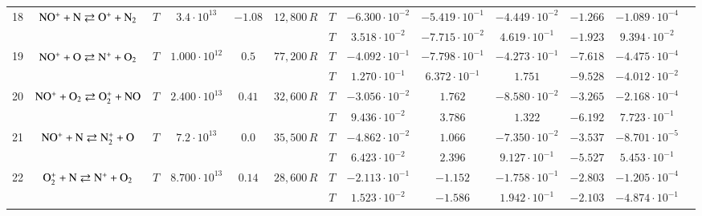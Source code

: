 \documentclass{warpdoc}
\begin{document}
\begin{table}[!ht]
\begin{center}
\begin{threeparttable}
\begin{tabular}{ccccccccccccc}
                                         
18 & $\rm NO^+ + N \rightleftarrows O^+ + N_2 $ &$T$ & $3.4 \cdot 10^{13}$ & $-1.08$ & $12,800\, R$ 
                                          &$T$  & $-6.300 \cdot 10^{-2}$  & $-5.419 \cdot 10^{-1}$  & $-4.449 \cdot 10^{-2}$ & $-1.266$ & $-1.089 \cdot 10^{-4}$ & \multirow{2}{*}{\cite{book:1990:park,ijhmt:2021:kim}} \\
 & & & & &                                &$T$  & $3.518 \cdot 10^{-2}$  & $-7.715 \cdot 10^{-2}$  & $4.619 \cdot 10^{-1}$ & $-1.923$ & $9.394 \cdot 10^{-2}$ & ~ \\
 
                                          
19 & $\rm NO^+ + O \rightleftarrows N^+ + O_2 $ &$T$ & $1.000 \cdot 10^{12}$ & $0.5$ & $77,200\, R$ 
                                          &$T$  & $-4.092 \cdot 10^{-1}$  & $-7.798 \cdot 10^{-1}$  & $-4.273 \cdot 10^{-1}$ & $-7.618$ & $-4.475 \cdot 10^{-4}$ & \multirow{2}{*}{\cite{book:1990:park,ijhmt:2021:kim}} \\
 & & & & &                                &$T$  & $1.270 \cdot 10^{-1}$  & $6.372 \cdot 10^{-1}$  & $1.751$ & $-9.528$ & $-4.012 \cdot 10^{-2}$ & ~ \\
 
                                          
20 & $\rm NO^{+} + O_2 \rightleftarrows O_2^{+} + NO $ &$T$ & $2.400 \cdot 10^{13}$ & $0.41$ & $32,600\, R$ 
                                          &$T$  & $-3.056 \cdot 10^{-2}$  & $1.762$  & $-8.580 \cdot 10^{-2}$ & $-3.265$ & $-2.168 \cdot 10^{-4}$ & \multirow{2}{*}{\cite{book:1990:park,ijhmt:2021:kim}} \\
 & & & & &                                &$T$  & $9.436 \cdot 10^{-2}$  & $3.786$  & $1.322$ & $-6.192$ & $7.723 \cdot 10^{-1}$ & ~ \\
 
                                          
21 & $\rm NO^+ + N \rightleftarrows N_2^+ + O $ &$T$ & $7.2 \cdot 10^{13}$ & $0.0$ & $35,500\, R$ 
                                          &$T$  & $-4.862 \cdot 10^{-2}$  & $1.066$  & $-7.350 \cdot 10^{-2}$ & $-3.537$ & $-8.701 \cdot 10^{-5}$ & \multirow{2}{*}{\cite{book:1990:park,ijhmt:2021:kim}} \\
 & & & & &                                &$T$  & $6.423 \cdot 10^{-2}$  & $2.396$  & $9.127 \cdot 10^{-1}$ & $-5.527$ & $5.453 \cdot 10^{-1}$ & ~ \\
 
                                          
22 & $\rm O_2^+ + N \rightleftarrows N^+ + O_2$ &$T$ & $8.700 \cdot 10^{13}$ & $0.14$ & $28,600\, R$ 
                                          &$T$  & $-2.113 \cdot 10^{-1}$  & $-1.152$  & $-1.758 \cdot 10^{-1}$ & $-2.803$ & $-1.205 \cdot 10^{-4}$ & \multirow{2}{*}{\cite{book:1990:park,ijhmt:2021:kim}} \\
 & & & & &                                &$T$  & $1.523 \cdot 10^{-2}$  & $-1.586$  & $1.942 \cdot 10^{-1}$ & $-2.103$ & $-4.874 \cdot 10^{-1}$ & ~ \\
 

\end{tabular}
\end{threeparttable}
\end{center}
\end{table}
\end{document}
